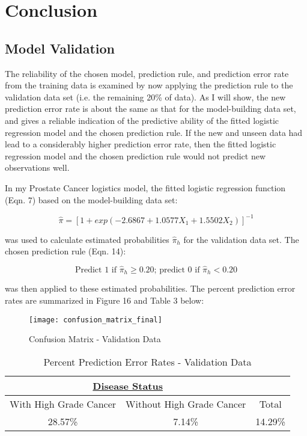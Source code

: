 %
%

\section{Conclusion}
\subsection{Model Validation}
The reliability of the chosen model, prediction rule, and prediction error rate from the training data is examined by now applying the prediction rule to the validation data set (i.e. the remaining 20\% of data). As I will show, the new prediction error rate is about the same as that for the model-building data set, and gives a reliable indication of the predictive ability of the fitted logistic regression model and the chosen prediction rule. If the new and unseen data had lead to a considerably higher prediction error rate, then the fitted logistic regression model and the chosen prediction rule would not predict new observations well. \par
In my Prostate Cancer logistics model, the fitted logistic regression function (Eqn. 7) based on the model-building data set:

\[
\hat{\pi}=[ 1+ exp(-2.6867 + 1.0577X_1 + 1.5502X_2)]^{-1}
\]

was used to calculate estimated probabilities \(\hat{\pi}_h\) for the validation data set. The chosen prediction rule (Eqn. 14):

\[
	\textrm{Predict 1 if } \hat{\pi}_h \geq 0.20\textrm{; predict 0 if } \hat{\pi}_h < 0.20
\]

was then applied to these estimated probabilities. The percent prediction error rates are summarized in Figure 16 and Table 3 below:

\begin{figure}[H]
	\centering
	\texttt{[image: confusion\_matrix\_final]}
	\caption{Confusion Matrix - Validation Data}
\end{figure}

\begin{table}[H]
	\centering
	\begin{tabular}{ |c|c||c| }
 	\multicolumn{2}{c}{\underline{Disease Status}} \\
 	\hline
 	With High Grade Cancer&Without High Grade Cancer&Total\\
 	28.57\%&7.14\%&14.29\%\\
 	\hline
	\end{tabular}
 	\caption{Percent Prediction Error Rates - Validation Data}
\end{table}

